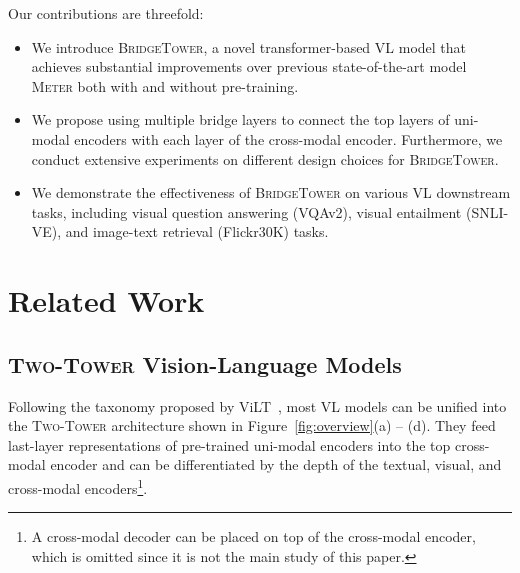 \documentclass[letterpaper]{article} %
\newcommand{\methodname}[0]{\textsc{BridgeTower}}
\newcommand{\metername}[0]{\textsc{Meter}}
\newcommand{\twotower}[0]{\textsc{Two-Tower}}
\begin{document}
Our contributions are threefold:
\begin{itemize}[noitemsep, nolistsep]
    \item We introduce \methodname{}, a novel transformer-based VL model that achieves substantial improvements over previous state-of-the-art model \metername{} both with and without pre-training.
    \item We propose using multiple bridge layers to connect the top layers of uni-modal encoders with each layer of the cross-modal encoder. Furthermore, we conduct extensive experiments on different design choices for \methodname{}.
    \item We demonstrate the effectiveness of \methodname{} on various VL downstream tasks, including visual question answering (VQAv2), visual entailment (SNLI-VE), and image-text retrieval (Flickr30K) tasks.
\end{itemize}

\section{Related Work}
\subsection{\twotower{} Vision-Language Models}
Following the taxonomy proposed by ViLT~\citep{kim2021vilt}, most VL models can be unified into the \twotower{} architecture shown in Figure~\ref{fig:overview}(a) -- (d). They feed last-layer representations of pre-trained uni-modal encoders into the top cross-modal encoder and can be differentiated by the depth of the textual, visual, and cross-modal encoders\footnote{A cross-modal decoder can be placed on top of the cross-modal encoder, which is omitted since it is not the main study of this paper.}.
\end{document}
